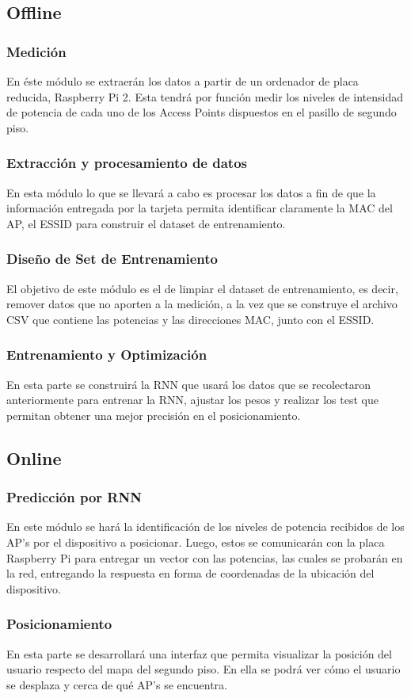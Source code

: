 \subsection{Offline}
\subsubsection{Medición}

En éste módulo se extraerán los datos a partir de un ordenador de placa reducida, Raspberry Pi 2. Esta tendrá por función medir los niveles de intensidad de potencia de cada uno de los Access Points dispuestos en el pasillo de segundo piso.

\subsubsection{Extracción y procesamiento de datos}
En esta módulo lo que se llevará a cabo es procesar los datos a fin de que la información entregada por la tarjeta permita identificar claramente la MAC del AP, el \ac{ESSID} para construir el dataset de entrenamiento.

\subsubsection{Diseño de Set de Entrenamiento}

El objetivo de este módulo es el de limpiar el dataset de entrenamiento, es decir, remover datos que no aporten a la medición, a la vez que se construye el archivo CSV que contiene las potencias y las direcciones MAC, junto con el ESSID.

\subsubsection{Entrenamiento y Optimización}
En esta parte se construirá la RNN que usará los datos que se recolectaron anteriormente para entrenar la RNN, ajustar los pesos y realizar los test que permitan obtener una mejor precisión en el posicionamiento.

\subsection{Online}

\subsubsection{Predicción por RNN}
En este módulo se hará la identificación de los niveles de potencia recibidos de los AP's por el dispositivo a posicionar.
Luego, estos se comunicarán con la placa Raspberry Pi para entregar un vector con las potencias, las cuales se probarán en la red, entregando la respuesta en forma de coordenadas de la ubicación del dispositivo.

\subsubsection{Posicionamiento}
En esta parte se desarrollará una interfaz que permita visualizar la posición del usuario respecto del mapa del segundo piso. En ella se podrá ver cómo el usuario se desplaza y cerca de qué AP's se encuentra.

